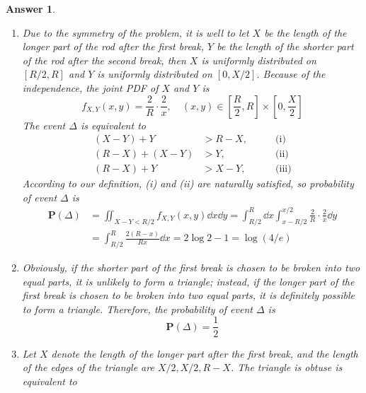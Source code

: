\documentclass[utf8]{article}
\theoremstyle{definition}%
\theoremstyle{plain}%
\newtheorem{answer}{Answer} %
\begin{document}
\begin{answer} ~
    \begin{enumerate}[label=(\alph*)]
        \item Due to the symmetry of the problem, it is well to let $X$ be the length of the longer part of the rod after the first break, $Y$ be the length of the shorter part of the rod after the second break, then $X$ is uniformly distributed on $[R/2, R]$ and $Y$ is uniformly distributed on $[0, X/2]$. Because of the independence, the joint PDF of $X$ and $Y$ is
        \begin{equation}
            f_{X, Y}(x, y) = \frac{2}{R} \cdot \frac{2}{x}, \quad (x, y) \in \left[\frac{R}{2}, R\right] \times \left[0, \frac{X}{2}\right]
        \end{equation}
        The event $\Delta$ is equivalent to 
        \begin{equation}
        \begin{aligned}
            (X - Y) + Y &> R - X, \quad\quad &\text{(i)} \\ 
            (R - X) + (X - Y) &> Y, \quad\quad &\text{(ii)} \\
            (R - X) + Y &> X - Y, \quad\quad &\text{(iii)}
        \end{aligned}
        \end{equation}
        According to our definition, (i) and (ii) are naturally satisfied, so probability of event $\Delta$ is
        \begin{equation}
        \begin{aligned}
            \mathbf{P}(\Delta) &= \iint_{X-Y<R/2} f_{X, Y}(x, y) \dd{x}\dd{y} = \int_{R/2}^{R} \dd{x} \int_{x-R/2}^{x/2} \frac{2}{R} \cdot \frac{2}{x} \dd{y} \\
            &= \int_{R/2}^{R} \frac{2(R - x)}{Rx} \dd{x} = 2\log 2 - 1 = \log(4/e)
        \end{aligned}
        \end{equation}
        \item Obviously, if the shorter part of the first break is chosen to be broken into two equal parts, it is unlikely to form a triangle; instead, if the longer part of the first break is chosen to be broken into two equal parts, it is definitely possible to form a triangle. Therefore, the probability of event $\Delta$ is
        \begin{equation}
            \mathbf{P}(\Delta) = \frac{1}{2}
        \end{equation}
        \item Let $X$ denote the length of the longer part after the first break, and the length of the edges of the triangle are $X/2, X/2, R-X$. The triangle is obtuse is equivalent to

\end{enumerate}
\end{answer}
\end{document}
